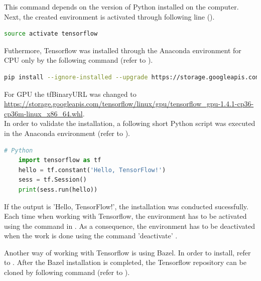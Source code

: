 This command depends on the version of Python installed on the computer. Next, the created environment is activated through following line ().

\begin{lstlisting}[caption=Activating the Anaconda environment, label=list:activation_anaconda, language=bash]
	source activate tensorflow
\end{lstlisting}

Futhermore, Tensorflow was installed through the Anaconda environment for CPU only by the following command (refer to ).

\begin{lstlisting}[caption=Installing Tensorflow through Anaconda, label=list:installing_tensorflow_anaconda, language=bash]
	pip install --ignore-installed --upgrade https://storage.googleapis.com/tensorflow/linux/cpu/	tensorflow-1.4.1-cp36-cp36m-linux_x86_64.whl
\end{lstlisting}

For GPU the tfBinaryURL was changed to \url{https://storage.googleapis.com/tensorflow/linux/gpu/tensorflow_gpu-1.4.1-cp36-cp36m-linux_x86_64.whl}. \\

In order to validate the installation, a following short Python script was executed in the Anaconda environment (refer to ).

\begin{lstlisting}[caption=Installing Tensorflow through Anaconda, label=list:validation_installation, language=python]
	# Python
	import tensorflow as tf
	hello = tf.constant('Hello, TensorFlow!')
	sess = tf.Session()
	print(sess.run(hello))
\end{lstlisting}

If the output is 'Hello, TensorFlow!', the installation was conducted sucessfully. Each time when working with Tensorflow, the environment has to be activated using the command in . As a consequence, the environment has to be deactivated when the work is done using the command 'deactivate' \citep{InstallTensorflow}.

Another way of working with Tensorflow is using Bazel. In order to install, refer to . 
After the Bazel installation is completed, the Tensorflow repository can be cloned by following command (refer to ).

